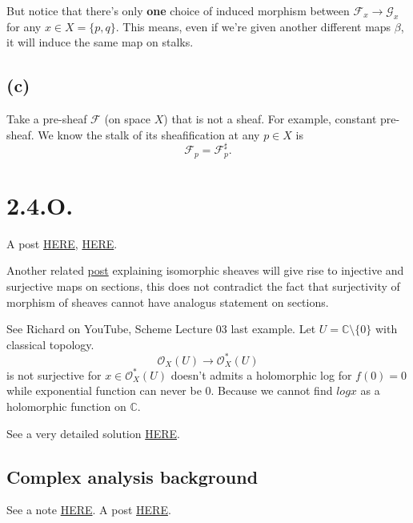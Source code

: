 But notice that there's only \textbf{one} choice of induced morphism between $\mathscr F_x\to\mathscr G_x$ for any $x\in X=\{p,q\}$. This means, even if we're given another different maps $\beta$, it will induce the same map on stalks.



\subsection{(c)}

Take a pre-sheaf $\mathscr F$ (on space $X$) that is not a sheaf. For example, constant pre-sheaf. We know the stalk of its sheafification at any $p\in X$ is 
\[\mathscr F_p=\mathscr F^{\sharp}_p.\]

\section{2.4.O.}

A post \href{https://math.stackexchange.com/questions/58306/examples-of-surjective-sheaf-morphisms-which-are-not-surjective-on-sections}{HERE}, \href{https://math.stackexchange.com/questions/232049/surjectivity-of-morphisms-of-sheaves-on-a-base}{HERE}.

Another related \href{https://math.stackexchange.com/questions/3939622/example-of-isomorphic-sheaves-whose-sections-arent-isomorphic}{post} explaining isomorphic sheaves will give rise to injective and surjective maps on sections, this does not contradict the fact that surjectivity of morphism of sheaves cannot have analogus statement on sections.

See Richard on YouTube, Scheme Lecture 03 last example. Let $U=\mathbb C\setminus \{0\}$ with classical topology. 
\[\mathscr O_X(U)\to\mathscr O_X^{\ast}(U)\] is not surjective for $x\in\mathscr O_X^{\ast}(U)$ doesn't admits a holomorphic log for $f(0)=0$ while exponential function can never be $0$. Because we cannot find $log x$ as a holomorphic function on $\mathbb C$.

See a very detailed solution \href{https://www2.math.ethz.ch/education/bachelor/lectures/fs2016/math/alg_geom/Solution12.pdf}{HERE}.

\subsection{Complex analysis background}

See a note \href{https://math.berkeley.edu/~vvdatar/m185f16/notes/Lecture-15_Logarithm.pdf}{HERE}. 
A post \href{https://math.stackexchange.com/questions/1803352/why-cant-we-define-a-branch-of-log-fz-in-the-whole-complex-plane}{HERE}.

